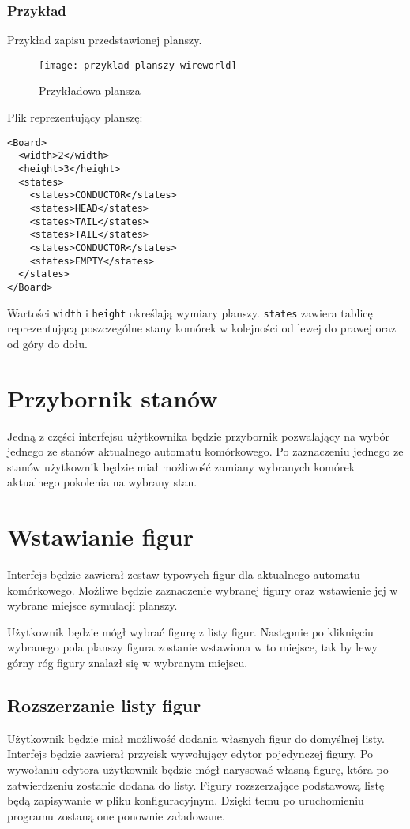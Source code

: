\documentclass{report}
\begin{document}
\subsubsection{Przykład}
Przykład zapisu przedstawionej planszy. 

\begin{figure}[H]
    \centering
    \texttt{[image: przyklad-planszy-wireworld]}
    \caption{Przykładowa plansza}
\end{figure}

\begin{samepage}
\noindent{}Plik reprezentujący planszę:
\begin{verbatim}
<Board>
  <width>2</width>
  <height>3</height>
  <states>
    <states>CONDUCTOR</states>
    <states>HEAD</states>
    <states>TAIL</states>
    <states>TAIL</states>
    <states>CONDUCTOR</states>
    <states>EMPTY</states>
  </states>
</Board>
\end{verbatim}
\end{samepage}
Wartości \texttt{width} i \texttt{height} określają wymiary planszy.
\texttt{states} zawiera tablicę reprezentującą poszczególne stany komórek w kolejności od lewej do prawej oraz od góry do dołu.

\section{Przybornik stanów}
Jedną z części interfejsu użytkownika będzie przybornik pozwalający na wybór jednego ze stanów aktualnego automatu komórkowego. Po zaznaczeniu jednego ze stanów użytkownik będzie miał możliwość zamiany wybranych komórek aktualnego pokolenia na wybrany stan.

\section{Wstawianie figur}
Interfejs będzie zawierał zestaw typowych figur dla aktualnego automatu komórkowego. Możliwe będzie zaznaczenie wybranej figury oraz wstawienie jej w wybrane miejsce symulacji planszy.

Użytkownik będzie mógł wybrać figurę z listy figur. Następnie po kliknięciu wybranego pola planszy figura zostanie wstawiona w to miejsce, tak by lewy górny róg figury znalazł się w wybranym miejscu.

\subsection{Rozszerzanie listy figur}
Użytkownik będzie miał możliwość dodania własnych figur do domyślnej listy.
Interfejs będzie zawierał przycisk wywołujący edytor pojedynczej figury. Po wywołaniu edytora użytkownik będzie mógł narysować własną figurę, która po zatwierdzeniu zostanie dodana do listy.
Figury rozszerzające podstawową listę będą zapisywanie w pliku konfiguracyjnym. Dzięki temu po uruchomieniu programu zostaną one ponownie załadowane. 
\end{document}
